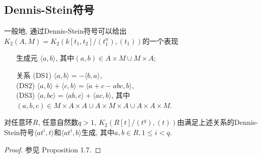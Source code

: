 \subsection{Dennis-Stein符号}
\label{sub:dennis_stein_symbols}
一般地, 通过Dennis-Stein符号可以给出$K_2(A, M)=K_2(k[t_1, t_2]/(t_1^n), (t_1))$的一个表现
\begin{itemize}
	\item[生成元]   $\langle a, b \rangle $, 其中$(a, b)\in A\times M \cup M \times A$;
	\item[关系] (DS1) $\langle a, b\rangle = -\langle b, a \rangle$, \\
				(DS2) $\langle a, b\rangle +\langle c, b \rangle=\langle a+c-abc, b\rangle$, \\
	 			(DS3) $\langle a, bc\rangle =\langle ab, c\rangle +\langle ac, b\rangle$, 其中$(a, b, c)\in  M\times A\times A \cup A\times M \times A \cup A\times A\times M$. 
\end{itemize}

\begin{prop}
	对任意环$R$, 任意自然数$q>1$, $K_2(R[t]/(t^q), (t))$由满足上述关系的Dennis-Stein符号$\langle at^i, t\rangle$和$\langle at^i, b\rangle$生成, 其中$a, b\in R, 1\leq i<q$. 
\end{prop}
\begin{proof}
	参见\cite{MR82k:13016} Proposition 1.7. 
\end{proof}


